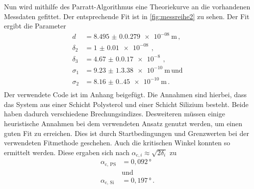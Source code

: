 Nun wird mithilfe des Parratt-Algorithmus eine Theoriekurve an die vorhandenen Messdaten gefittet.
Der entsprechende Fit ist in \autoref{fig:messreihe2} zu sehen.
Der Fit ergibt die Parameter
\begin{align*}
    d & = \qty{8.495(0.0279)e-08}{\unit\meter} \, , \\
    \delta_2 & = \qty{1(0.01)e-08}{} \, , \\
    \delta_3 & = \qty{4.67(0.017)e-8}{} \, , \\
    \sigma_1 & = \qty{9.23(1.338)e-10}{\unit\meter} \, \text{und} \\
    \sigma_2 & = \qty{8.16(0.45)e-10}{\unit\meter} \, . \\
\end{align*}
Der verwendete Code ist im Anhang beigefügt.
Die Annahmen sind hierbei, dass das System aus einer Schicht Polysterol und einer Schicht Silizium besteht.
Beide haben dadurch verschiedene Brechungsindizes.
Desweiteren müssen einige heuristische Annahmen bei dem verwendeten Ansatz genutzt werden, um einen guten Fit zu erreichen.
Dies ist durch Startbedingungen und Grenzwerten bei der verwendeten Fitmethode geschehen.
Auch die kritischen Winkel konnten so ermittelt werden.
Diese ergaben sich nach $\alpha_{\text{c}, i} \approx \sqrt{2 \delta_i}$ zu
\begin{align*}
    \alpha_{\text{c, PS}} &= 0{,}092 \, ° \\
    &\text{und} \\
    \alpha_{\text{c, Si}} &= 0{,}197 \, ° \, .
\end{align*}